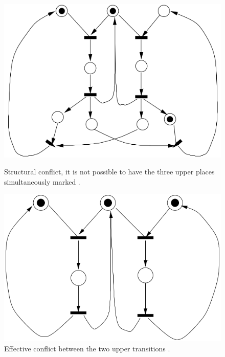\documentclass[12pt,english]{article} %
\begin{document}
\

\begin{figure}[h]
    \centering
    \begin{minipage}[t]{.45\textwidth}
      \centering
      \includegraphics[width=0.85\linewidth]{img/petri-net/mpn/conflict/mpn_with_structural_conflict.png}
      \caption{Structural conflict, it is not possible to have the three upper places simultaneously marked \cite{lecture-notes-concurrent-systems-validation}.}
      \label{fig:marked-petri-net-structural-conflict}
    \end{minipage}
    \hspace{0.25cm}
    \begin{minipage}[t]{.45\textwidth}
      \centering
      \includegraphics[width=0.85\linewidth]{img/petri-net/mpn/conflict/mpn_with_effective_conflict.png}
      \caption{Effective conflict between the two upper transitions \cite{lecture-notes-concurrent-systems-validation}.}
      \label{fig:marked-petri-net-effective-conflict}
    \end{minipage}
\end{figure}
\end{document}
